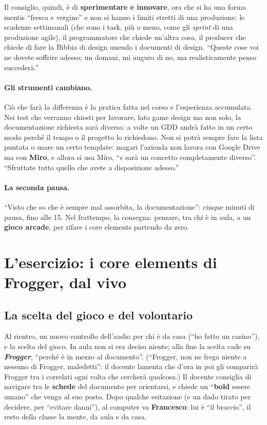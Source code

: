 Il consiglio, quindi, è di \textbf{sperimentare e innovare}, ora che si ha
una forma mentis ``fresca e vergine'' e non si hanno i limiti stretti di una
produzione: le scadenze settimanali (che sono i task, più o meno, come gli
\emph{sprint} di una produzione agile), il programmatore che chiede un'altra
cosa, il producer che chiede di fare la Bibbia di design unendo i documenti di
design. ``Queste cose voi ne dovete soffrire adesso; un domani, mi auguro di
no, ma realisticamente penso succederà.''

\paragraph{Gli strumenti cambiano.} Ciò che farà la differenza è la pratica
fatta nel corso e l'esperienza accumulata. Nei test che verranno chiesti per
lavorare, lato game design ma non solo, la documentazione richiesta sarà
diversa: a volte un GDD andrà fatto in un certo modo perché il tempo o il
progetto lo richiedono. Non si potrà sempre fare la lista puntata o usare un
certo template: magari l'azienda non lavora con Google Drive ma con
\textbf{Miro}, e allora si usa Miro, ``e sarà un concetto completamente
diverso''. ``Sfruttate tutto quello che avete a disposizione adesso.''

\paragraph{La seconda pausa.} ``Visto che so che è sempre mal assorbita, la
documentazione'': cinque minuti di pausa, fino alle 15. Nel frattempo, la
consegna: pensare, tra chi è in aula, a un \textbf{gioco arcade}, per rifare
i core elements partendo da zero.

\section{L'esercizio: i core elements di Frogger, dal vivo}
\label{gd9:sec:esercizio}

\subsection{La scelta del gioco e del volontario}

Al rientro, un nuovo controllo dell'audio per chi è da casa (``ho fatto un
casino''), e la scelta del gioco. In aula non si era deciso niente; alla fine
la scelta cade su \textbf{\emph{Frogger}}, ``perché è in mezzo al
documento''. (``Frogger, non ne frega niente a nessuno di Frogger,
maledetti'': il docente lamenta che d'ora in poi gli comparirà Frogger tra i
correlati ogni volta che cercherà qualcosa.) Il docente consiglia di navigare
tra le \textbf{schede} del documento per orientarsi, e chiede un
``\textbf{bold} essere umano'' che venga al suo posto. Dopo qualche esitazione
(e un dado tirato per decidere, per ``evitare danni''), al computer va
\textbf{Francesco}: lui è ``il braccio'', il resto della classe la mente, da
aula e da casa.

